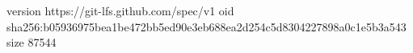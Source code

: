 version https://git-lfs.github.com/spec/v1
oid sha256:b05936975bea1be472bb5ed90e3eb688ea2d254c5d8304227898a0c1e5b3a543
size 87544
